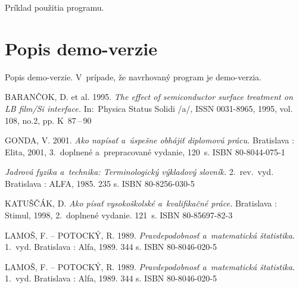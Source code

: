 \documentclass[a4paper]{feidippp}
\begin{document}
Príklad použitia programu.

\section{Popis demo-verzie}

Popis demo-verzie. V~prípade, že navrhovaný program je demo-verzia.

\listoffigures

\listoftables


\def\refname{Zoznam použitej literatúry}

\begin{thebibliography}{999}
BARANČOK, D. et al. 1995. \emph{The effect of semiconductor surface treatment on LB film/Si interface.} In:~Physica Status Solidi /a/,  ISSN 0031-8965, 1995, vol. 108, no.2, pp. K~87\,--\,90

GONDA, V. 2001. \emph{Ako napísať a~úspešne obhájiť diplomovú prácu.} Bratislava : Elita, 2001, 3.~doplnené a~prepracované vydanie, 120~s. ISBN 80-8044-075-1

\emph{Jadrová fyzika a~technika: Terminologický výkladový slovník.} 2.~rev.~vyd. Bratislava : ALFA, 1985. 235 s. ISBN 80-8256-030-5

KATUŠČÁK, D. \emph{Ako písať vysokoškolské a~kvalifikačné práce.} Bratislava : Stimul, 1998, 2.~doplnené vydanie. 121~s. ISBN 80-85697-82-3


LAMOŠ, F. -- POTOCKÝ, R. 1989. \emph{Pravdepodobnosť a~matematická štatistika.} 1.~vyd. Bratislava : Alfa, 1989. 344 s. ISBN 80-8046-020-5


LAMOŠ, F. -- POTOCKÝ, R. 1989. \emph{Pravdepodobnosť a~matematická štatistika.} 1.~vyd. Bratislava : Alfa, 1989. 344 s. ISBN 80-8046-020-5


\end{thebibliography}
\end{document}
